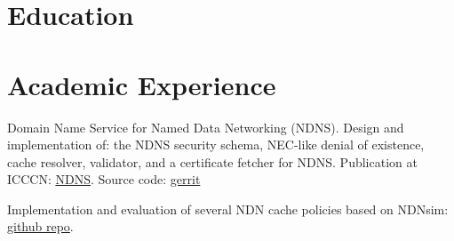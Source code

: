 \documentclass[]{deedy-resume-openfont}
\begin{document}
%
%
\lastupdated

%
%






\section{Education}
 

\section{Academic Experience}


\begin{tightemize}
\item Domain Name Service for Named Data Networking (NDNS). Design and implementation of: the NDNS security schema, NEC-like denial of existence, cache resolver, validator, and a certificate fetcher for NDNS. Publication at ICCCN: \href{https://named-data.net/publications/2017-icccn-ndns/}{NDNS}. Source code: \href{https://gerrit.named-data.net/#/q/project:ndns}{gerrit}
\item Implementation and evaluation of several NDN cache policies based on NDNsim: \href{https://github.com/ndncomm/nfd-caching-policies}{github repo}.
\end{tightemize}
\sectionsep
\end{document}
